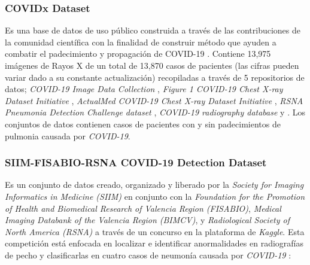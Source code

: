 \subsubsection{COVIDx  Dataset}

Es una base de datos de uso público construida a través de las contribuciones de la comunidad
científica con la finalidad de construir método que ayuden a combatir el padecimiento y propagación
de COVID-19 \cite{Wang2020}. Contiene 13,975 imágenes de Rayos X de un total de 13,870 casos de
pacientes (las cifras pueden variar dado a su constante actualización) recopiladas a través de 5
repositorios de datos; \textit{COVID-19 Image Data Collection} \cite{cohen2020covid19},
\textit{Figure 1 COVID-19 Chest X-ray Dataset Initiative} \cite{figure1_2020covid19},
\textit{ActualMed COVID-19 Chest X-ray Dataset Initiative} \cite{actualmed_2020covid19},
\textit{RSNA Pneumonia Detection Challenge dataset} \cite{rsna_det_challlenge},
\textit{COVID-19 radiography database} y \cite{rsna_det_challenge2}. Los conjuntos de datos
contienen casos de pacientes con y sin padecimientos de pulmonia causada por \textit{COVID-19}.

\subsubsection{SIIM-FISABIO-RSNA COVID-19 Detection Dataset}

Es un conjunto de datos creado, organizado y liberado por la \textit{Society for Imaging Informatics
in Medicine (SIIM)} en conjunto con la
\textit{Foundation for the Promotion of Health and Biomedical Research of Valencia Region (FISABIO)},
\textit{Medical Imaging Databank of the Valencia Region (BIMCV)}, y
\textit{Radiological Society of North America (RSNA)} \cite{siim_det_challenge} a través de un
concurso en la plataforma de \textit{Kaggle}. Esta competición está enfocada en localizar
e identificar anormalidades en radiografías de pecho y clasificarlas en cuatro casos de neumonía
causada por \textit{COVID-19} \cite{00005382-202011000-00004}:

